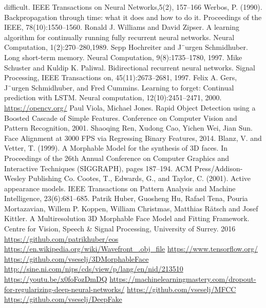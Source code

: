 \documentclass[a4paper, openany, oneside, 11pt]{book}
\begin{document}
\begin{thebibliography}{99}
difficult. IEEE Transactions on Neural Networks,5(2), 157–166
Werbos, P. (1990). Backpropagation through time: what it does and how to do it. Proceedings of the
IEEE, 78(10):1550–1560.
Ronald J. Williams and David Zipser. A learning algorithm for continually running fully recurrent neural networks. Neural Computation, 1(2):270–280,1989.
Sepp Hochreiter and J¨urgen Schmidhuber. Long short-term memory. Neural Computation, 9(8):1735–1780, 1997.
Mike Schuster and Kuldip K. Paliwal. Bidirectional recurrent neural networks.
Signal Processing, IEEE Transactions on, 45(11):2673–2681, 1997.
Felix A. Gers, J¨urgen Schmidhuber, and Fred Cummins. Learning to forget:
Continual prediction with LSTM. Neural computation, 12(10):2451–2471,
2000.
\url{https://opencv.org/}
Paul Viola, Michael Jones. Rapid Object Detection using a Boosted Cascade of Simple Features. Conference on Computer Vision and Pattern Recognition, 2001.
Shaoqing Ren, Xudong Cao, Yichen Wei, Jian Sun. Face Alignment at 3000 FPS via Regressing Binary Features, 2014.
Blanz, V. and Vetter, T. (1999). A Morphable Model for the
synthesis of 3D faces. In Proceedings of the 26th Annual Conference on Computer Graphics and Interactive Techniques (SIGGRAPH), pages 187–194. ACM
Press/Addison-Wesley Publishing Co.
Cootes, T., Edwards, G., and Taylor, C. (2001). Active appearance models. IEEE Transactions on Pattern Analysis and Machine Intelligence, 23(6):681–685.
Patrik Huber, Guosheng Hu, Rafael Tena, Pouria Mortazavian, Willem P. Koppen, William Christmas, Matthias R{\"a}tsch and Josef Kittler. A Multiresolution 3D Morphable Face Model and Fitting Framework. Centre for Vision, Speech \& Signal Processing, University of Surrey. 2016
\url{https://github.com/patrikhuber/eos}
\url{https://en.wikipedia.org/wiki/Wavefront_.obj_file}
\url{https://www.tensorflow.org/}
\url{https://github.com/vseselj/3DMorphableFace}
\url{http://sine.ni.com/nips/cds/view/p/lang/en/nid/213510}
\url{https://youtu.be/x0foFozDmDQ}
\url{https://machinelearningmastery.com/dropout-for-regularizing-deep-neural-networks/}
\url{https://github.com/vseselj/MFCC}
\url{https://github.com/vseselj/DeepFake}
\end{thebibliography}

\newpage
\listoffigures
\listoftables

\newpage
{}
\printglossary[title=Spisak skrac1enica, type=\acronymtype]
\end{document}
